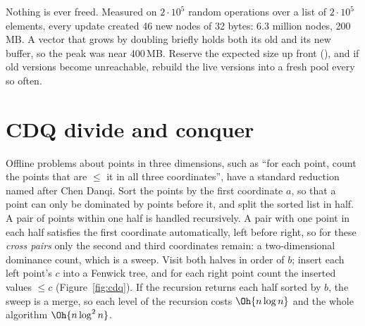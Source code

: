 
\begin{pitfall}[Memory]
Nothing is ever freed. Measured on $2 \cdot 10^5$ random operations over a list of $2 \cdot 10^5$ elements, every update created 46
new nodes of 32 bytes: 6.3 million nodes, 200\,MB. A vector that grows by doubling briefly holds both its old and its new buffer, so
the peak was near 400\,MB. Reserve the expected size up front (), and if old versions become
unreachable, rebuild the live versions into a fresh pool every so often.
\end{pitfall}

\section[CDQ divide and conquer]{CDQ divide and conquer \hfill \ioi}\label{sec:cdq}

Offline problems about points in three dimensions, such as ``for each point, count the points that are $\le$ it in all three
coordinates'', have a standard reduction named after Chen Danqi. Sort the points by the first coordinate $a$, so that a point can only
be dominated by points before it, and split the sorted list in half. A pair of points within one half is handled recursively. A pair
with one point in each half satisfies the first coordinate automatically, left before right, so for these \emph{cross pairs} only the
second and third coordinates remain: a two-dimensional dominance count, which is a sweep. Visit both halves in order of $b$; insert
each left point's $c$ into a Fenwick tree, and for each right point count the inserted values $\le c$ (Figure~\ref{fig:cdq}). If the
recursion returns each half sorted by $b$, the sweep is a merge, so each level of the recursion costs $\Oh{n \log n}$ and the whole
algorithm $\Oh{n \log^2 n}$.

